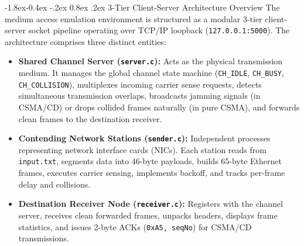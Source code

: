 \documentclass[11pt,a4paper]{article}
\makeatletter
\renewcommand\subsection{\@startsection{subsection}{2}{\z@}%
                                     {-1.8ex\@plus -0.4ex \@minus -.2ex}%
                                     {0.8ex \@plus .2ex}%
                                     {\normalfont\large\bfseries}}
\makeatother
\begin{document}
\subsection{3-Tier Client-Server Architecture Overview}
The medium access emulation environment is structured as a modular 3-tier client-server socket pipeline operating over TCP/IP loopback (\texttt{127.0.0.1:5000}). The architecture comprises three distinct entities:
\begin{itemize}
    \item \textbf{Shared Channel Server (\texttt{server.c}):} Acts as the physical transmission medium. It manages the global channel state machine (\texttt{CH\_IDLE}, \texttt{CH\_BUSY}, \texttt{CH\_COLLISION}), multiplexes incoming carrier sense requests, detects simultaneous transmission overlaps, broadcasts jamming signals (in CSMA/CD) or drops collided frames naturally (in pure CSMA), and forwards clean frames to the destination receiver.
    \item \textbf{Contending Network Stations (\texttt{sender.c}):} Independent processes representing network interface cards (NICs). Each station reads from \texttt{input.txt}, segments data into 46-byte payloads, builds 65-byte Ethernet frames, executes carrier sensing, implements backoff, and tracks per-frame delay and collisions.
    \item \textbf{Destination Receiver Node (\texttt{receiver.c}):} Registers with the channel server, receives clean forwarded frames, unpacks headers, displays frame statistics, and issues 2-byte ACKs (\texttt{0xA5, seqNo}) for CSMA/CD transmissions.
\end{itemize}
\end{document}
